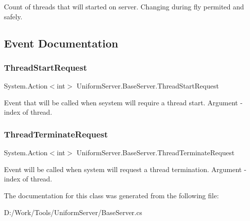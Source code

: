 Count of threads that will started on server. Changing during fly permited and safely. 



\subsection{Event Documentation}
\mbox{\label{class_uniform_server_1_1_base_server_a440a854a955ab7c5e563918c12e9b32c}} 
\subsubsection{\texorpdfstring{Thread\+Start\+Request}{ThreadStartRequest}}
{\footnotesize\ttfamily System.\+Action$<$int$>$ Uniform\+Server.\+Base\+Server.\+Thread\+Start\+Request\hspace{0.3cm}{\ttfamily [static]}}



Event that will be called when seystem will require a thread start. Argument -\/ index of thread. 

\mbox{\label{class_uniform_server_1_1_base_server_a889c3aaa1cca7f4a9a4e32617516f4be}} 
\subsubsection{\texorpdfstring{Thread\+Terminate\+Request}{ThreadTerminateRequest}}
{\footnotesize\ttfamily System.\+Action$<$int$>$ Uniform\+Server.\+Base\+Server.\+Thread\+Terminate\+Request\hspace{0.3cm}{\ttfamily [static]}}



Event will be called when system will request a thread termination. Argument -\/ index of thread. 



The documentation for this class was generated from the following file\+:\begin{DoxyCompactItemize}
\item 
D\+:/\+Work/\+Tools/\+Uniform\+Server/Base\+Server.\+cs\end{DoxyCompactItemize}
